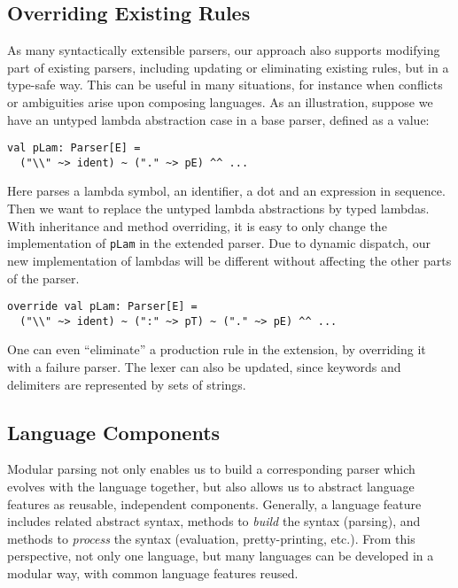 \subsection{Overriding Existing Rules}\label{subsec:overriding-rules}

As many syntactically extensible parsers, our approach also supports
modifying part of existing parsers, including updating or eliminating existing rules,
but in a type-safe way. This can be useful in many
situations, for instance when conflicts or ambiguities arise upon composing languages.
As an illustration, suppose we have an untyped lambda abstraction case in a base parser, defined as a value:
\begin{lstlisting}
val pLam: Parser[E] =
  ("\\" ~> ident) ~ ("." ~> pE) ^^ ...
\end{lstlisting}
Here  parses a lambda symbol, an identifier, a dot and an expression in sequence.
Then we want to replace the untyped lambda abstractions by typed
lambdas. With inheritance and method overriding, it is easy to only
change the implementation of \lstinline{pLam} in the extended parser.
Due to dynamic dispatch, our new
implementation of lambdas will be different without affecting the other parts of the parser.
\begin{lstlisting}
override val pLam: Parser[E] =
  ("\\" ~> ident) ~ (":" ~> pT) ~ ("." ~> pE) ^^ ...
\end{lstlisting}


One can even ``eliminate'' a production rule in the extension, by overriding it with a failure parser. The lexer can also be updated, since keywords and delimiters are represented by sets of strings.


\subsection{Language Components}\label{subsec:language-component}

Modular parsing not only enables us to build a corresponding parser
which evolves with the language together, but also allows us to
abstract language features as reusable, independent components.
Generally, a language feature includes related abstract syntax,
methods to \textit{build} the syntax (parsing), and methods to
\textit{process} the syntax (evaluation, pretty-printing, etc.). From
this perspective, not only one language, but many languages can be
developed in a modular way, with common language features reused.

